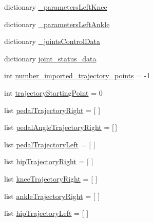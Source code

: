 \begin{DoxyCompactItemize}
\item 
dictionary \mbox{\hyperlink{namespacepedal__simulation__interpolation__lennard_a15ebaefa1e294fd8fcfcd1757c609710}{\+\_\+parameters\+Left\+Knee}}
\item 
dictionary \mbox{\hyperlink{namespacepedal__simulation__interpolation__lennard_a4fcc2a8d3c7e63760c2fad5bcaa96028}{\+\_\+parameters\+Left\+Ankle}}
\item 
dictionary \mbox{\hyperlink{namespacepedal__simulation__interpolation__lennard_a3f49ea6545158a29067f23151f804d05}{\+\_\+joints\+Control\+Data}}
\item 
dictionary \mbox{\hyperlink{namespacepedal__simulation__interpolation__lennard_a452347a99d9bff87737ddb94350081c3}{joint\+\_\+status\+\_\+data}}
\item 
int \mbox{\hyperlink{namespacepedal__simulation__interpolation__lennard_a2e564c7f90e42efb5db98ea04bf643a2}{number\+\_\+imported\+\_\+trajectory\+\_\+points}} = -\/1
\item 
int \mbox{\hyperlink{namespacepedal__simulation__interpolation__lennard_a512ee2b5ae089f50ef79f662f5dcd9d7}{trajectory\+Starting\+Point}} = 0
\item 
list \mbox{\hyperlink{namespacepedal__simulation__interpolation__lennard_a665c72fe3699574ecc5b9511425c9788}{pedal\+Trajectory\+Right}} = \mbox{[} \mbox{]}
\item 
list \mbox{\hyperlink{namespacepedal__simulation__interpolation__lennard_a456862740fa0ad18fad0f53b0ee8b0e9}{pedal\+Angle\+Trajectory\+Right}} = \mbox{[}$\,$\mbox{]}
\item 
list \mbox{\hyperlink{namespacepedal__simulation__interpolation__lennard_a578a0229cbc6c813469e7960453be829}{pedal\+Trajectory\+Left}} = \mbox{[} \mbox{]}
\item 
list \mbox{\hyperlink{namespacepedal__simulation__interpolation__lennard_a8d0095e7258850eb267921ec17fffba4}{hip\+Trajectory\+Right}} = \mbox{[} \mbox{]}
\item 
list \mbox{\hyperlink{namespacepedal__simulation__interpolation__lennard_a02f4cbf326e10f6874b86130f85ba156}{knee\+Trajectory\+Right}} = \mbox{[} \mbox{]}
\item 
list \mbox{\hyperlink{namespacepedal__simulation__interpolation__lennard_a78928fe682f1e515ec45deeb4691928f}{ankle\+Trajectory\+Right}} = \mbox{[} \mbox{]}
\item 
list \mbox{\hyperlink{namespacepedal__simulation__interpolation__lennard_a5319405a7f9f155312814a5b5758ea28}{hip\+Trajectory\+Left}} = \mbox{[} \mbox{]}
\item 

\end{DoxyCompactItemize}
